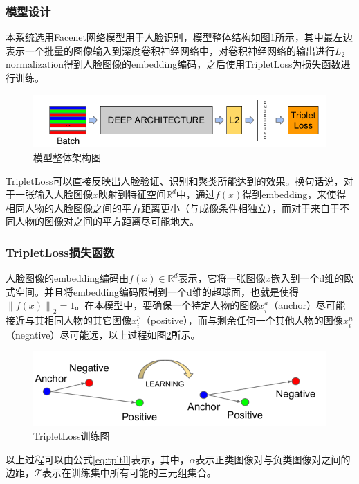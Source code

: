 \subsubsection{模型设计}

本系统选用Facenet网络模型用于人脸识别，模型整体结构如图\ref{fig:modelarc}所示，其中最左边表示一个批量的图像输入到深度卷积神经网络中，对卷积神经网络的输出进行$L_{2}$ normalization得到人脸图像的embedding编码，之后使用TripletLoss为损失函数进行训练。

\begin{figure}[H]
    \centering
    \includegraphics[width=.75\textwidth]{figures/4modelarc.png}
    \caption{模型整体架构图}
    \label{fig:modelarc}
\end{figure}

TripletLoss可以直接反映出人脸验证、识别和聚类所能达到的效果。换句话说，对于一张输入人脸图像$x$映射到特征空间$\mathbb{R}^d$中，通过$f(x)$得到embedding，来使得相同人物的人脸图像之间的平方距离更小（与成像条件相独立），而对于来自于不同人物的图像对之间的平方距离尽可能地大。

\subsubsection{TripletLoss损失函数}

人脸图像的embedding编码由$f(x)\in\mathbb{R}^d$表示，它将一张图像$x$嵌入到一个d维的欧式空间。并且将embedding编码限制到一个d维的超球面，也就是使得$\left \| f(x) \right \| _2=1$。在本模型中，要确保一个特定人物的图像$x_i^a$（anchor）尽可能接近与其相同人物的其它图像$x_i^p$（positive），而与剩余任何一个其他人物的图像$x_i^n$（negative）尽可能远，以上过程如图\ref{fig:tpltll}所示。

\begin{figure}[H]
    \centering
    \includegraphics[width=.75\textwidth]{figures/4tpltll.png}
    \caption{TripletLoss训练图}
    \label{fig:tpltll}
\end{figure}

以上过程可以由公式\ref{eq:tpltll}表示，其中，$\alpha$表示正类图像对与负类图像对之间的边距，$\mathcal{T}$表示在训练集中所有可能的三元组集合。

